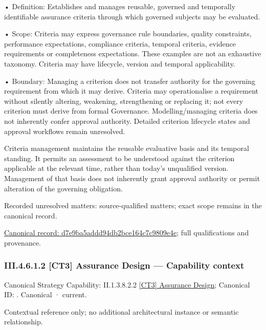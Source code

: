 •
Definition: Establishes and manages reusable, governed and temporally identifiable assurance criteria through which governed subjects may be evaluated.



•
Scope: Criteria may express governance rule boundaries, quality constraints, performance expectations, compliance criteria, temporal criteria, evidence requirements or completeness expectations. These examples are not an exhaustive taxonomy. Criteria may have lifecycle, version and temporal applicability.



•
Boundary: Managing a criterion does not transfer authority for the governing requirement from which it may derive. Criteria may operationalise a requirement without silently altering, weakening, strengthening or replacing it; not every criterion must derive from formal Governance. Modelling/managing criteria does not inherently confer approval authority. Detailed criterion lifecycle states and approval workflows remain unresolved.



Criteria management maintains the reusable evaluative basis and its temporal standing. It permits an assessment to be understood against the criterion applicable at the relevant time, rather than today's unqualified version. Management of that basis does not inherently grant approval authority or permit alteration of the governing obligation.


{\small Recorded unresolved matters: source-qualified matters; exact scope remains in the canonical record.}\par
{\footnotesize \href{../../../../continuum/business/business-function/d7e9ba5addd94db2bce164c7c9809e4e.md}{Canonical record: d7e9ba5addd94db2bce164c7c9809e4e}; full qualifications and provenance.}\par
\subsubsection*{III.4.6.1.2 [CT3] Assurance Design — Capability context}
\label{navigation:III.4.6.1.2}

{\small Canonical Strategy Capability: II.1.3.8.2.2 \hyperref[element:71c8a612b88f4ecba049e94d506bd0c2]{[CT3] Assurance Design}; Canonical ID: \texttt{}. Canonical · current.}\par
Contextual reference only; no additional architectural instance or semantic relationship.\par
